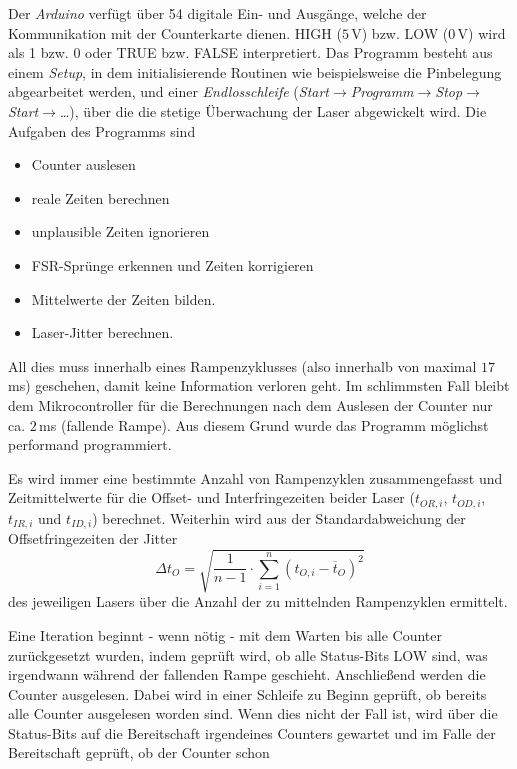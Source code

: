 Der \textit{Arduino} verfügt über 54 digitale Ein- und Ausgänge, welche der
Kommunikation mit der Counterkarte dienen. HIGH ($5\,$V) bzw. LOW ($0\,$V) wird
als 1 bzw. 0 oder TRUE bzw. FALSE interpretiert. Das Programm besteht aus
einem
\textit{Setup}, in dem initialisierende Routinen wie beispielsweise die
Pinbelegung abgearbeitet werden, und einer \textit{Endlosschleife} (\textit{Start}$\rightarrow$\textit{Programm}$\rightarrow$\textit{Stop}$\rightarrow$\textit{Start}$\rightarrow$\ldots),
über die die stetige Überwachung der Laser abgewickelt wird. Die Aufgaben des
Programms sind
\begin{itemize}
	\item Counter auslesen
	\item reale Zeiten berechnen
	\item unplausible Zeiten ignorieren
	\item FSR-Sprünge erkennen und Zeiten korrigieren
	\item Mittelwerte der Zeiten bilden.
	\item Laser-Jitter berechnen.
\end{itemize}
All dies muss innerhalb eines Rampenzyklusses (also innerhalb von maximal
$17\,$ms) geschehen, damit keine Information verloren geht. Im schlimmsten Fall
bleibt dem Mikrocontroller für die Berechnungen nach dem Auslesen der Counter
nur ca. $2\,$ms (fallende Rampe). Aus diesem Grund wurde das Programm möglichst
performand programmiert.\par Es wird immer eine bestimmte Anzahl von Rampenzyklen zusammengefasst und Zeitmittelwerte für die Offset- und Interfringezeiten beider Laser ($t_{OR,i}$,
$t_{OD,i}$, $t_{IR,i}$ und $t_{ID,i}$) berechnet. Weiterhin wird aus der
Standardabweichung der Offsetfringezeiten der Jitter
\begin{equation}\label{eq:jitter_zeit}
	\Delta
	t_O=\sqrt{\frac{1}{n-1}\cdot\sum\limits_{i=1}^{n}\left(t_{O,i}-\overline{t}_O\right)^2}
\end{equation}
des jeweiligen Lasers über die Anzahl der zu mittelnden Rampenzyklen
ermittelt.\par
Eine Iteration beginnt - wenn nötig - mit dem Warten bis alle
Counter zurückgesetzt wurden, indem geprüft wird, ob alle Status-Bits LOW sind, was irgendwann während der fallenden Rampe geschieht.
Anschließend werden die Counter ausgelesen. Dabei wird in einer Schleife zu
Beginn geprüft, ob bereits alle Counter ausgelesen worden sind. Wenn dies nicht
der Fall ist, wird über die Status-Bits auf die Bereitschaft irgendeines
Counters gewartet und im Falle der Bereitschaft geprüft, ob der Counter schon
